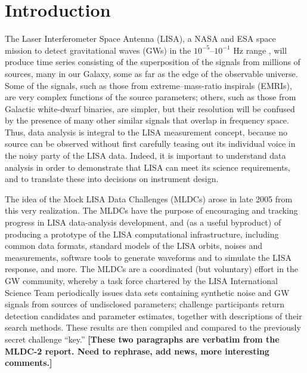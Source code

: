 \documentclass{iopart}
\begin{document}
\vspace{-18pt}


\section{Introduction}

The Laser Interferometer Space Antenna (LISA), a NASA and ESA space mission to detect gravitational waves (GWs) in the $10^{-5}$--$10^{-1}$ Hz range \cite{lisa}, will produce time series consisting of the superposition of the signals from millions of sources, many in our Galaxy, some as far as the edge of the observable universe. Some of the signals, such as those from extreme--mass-ratio inspirals (EMRIs), are very complex functions of the source parameters; others, such as those from Galactic white-dwarf binaries, are simpler, but their resolution will be confused by the presence of many other similar signals that overlap in frequency space. Thus, data analysis is integral to the LISA measurement concept, because no source can be observed without first carefully teasing out its individual voice in the noisy party of the LISA data. Indeed, it is important to understand data analysis in order to demonstrate that LISA can meet its science requirements, and to translate these into decisions on instrument design.

The idea of the Mock LISA Data Challenges (MLDCs) arose in late 2005 from this very realization. The MLDCs have the purpose of encouraging and tracking progress in LISA data-analysis development, and (as a useful byproduct) of producing a prototype of the LISA computational infrastructure, including common data formats, standard models of the LISA orbits, noises and measurements, software tools to generate waveforms and to simulate the LISA response, and more. The MLDCs are a coordinated (but voluntary) effort in the GW community, whereby a task force chartered by the LISA International Science Team periodically issues data sets containing synthetic noise and GW signals from sources of undisclosed parameters; challenge participants return detection candidates and parameter estimates, together with descriptions of their search methods. These results are then compiled and compared to the previously secret challenge ``key.'' \textbf{[These two paragraphs are verbatim from the MLDC-2 report. Need to rephrase, add news, more interesting comments.]}
\end{document}
